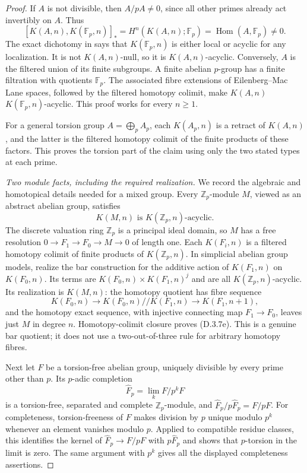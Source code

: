 \begin{proof}
If $A$ is not divisible, then $A/pA\ne0$, since all other primes
already act invertibly on $A$.  Thus
\[
 [K(A,n),K(\mathbb F_p,n)]_*
   =H^n(K(A,n);\mathbb F_p)
   =\operatorname{Hom}(A,\mathbb F_p)\ne0.
\]
The exact dichotomy in
\citet[Lemma~9.13]{EH5Bousfield1997} says that
$K(\mathbb F_p,n)$ is either local or acyclic for any localization.
It is not $K(A,n)$-null, so it is $K(A,n)$-acyclic.  Conversely,
$A$ is the filtered union of its finite subgroups.  A finite abelian
$p$-group has a finite filtration with quotients $\mathbb F_p$.
The associated fibre extensions of Eilenberg--Mac Lane spaces,
followed by the filtered homotopy colimit, make $K(A,n)$
$K(\mathbb F_p,n)$-acyclic.  This proof works for every $n\geq1$.

For a general torsion group $A=\bigoplus_p A_p$, each $K(A_p,n)$
is a retract of $K(A,n)$, and the latter is the filtered homotopy
colimit of the finite products of these factors.  This proves the
torsion part of the claim using only the two stated types at each
prime.

\medskip\noindent
\emph{Two module facts, including the required realization.}
We record the algebraic and homotopical details needed for a mixed
group.  Every $\mathbb Z_p$-module $M$, viewed as an abstract abelian
group, satisfies
\[
              K(M,n)\text{ is }K(\mathbb Z_p,n)\text{-acyclic}.
 \tag{D.3.7e}
\]
The discrete valuation ring $\mathbb Z_p$ is a principal ideal
domain, so $M$ has a free resolution
$0\to F_1\to F_0\to M\to0$ of length one.  Each $K(F_i,n)$ is
a filtered homotopy colimit of finite products of
$K(\mathbb Z_p,n)$.  In simplicial abelian group models, realize the
bar construction for the additive action of $K(F_1,n)$ on
$K(F_0,n)$.  Its terms are
$K(F_0,n)\times K(F_1,n)^j$ and are all
$K(\mathbb Z_p,n)$-acyclic.  Its realization is $K(M,n)$: the
homotopy quotient has fibre sequence
\[
 K(F_0,n)\longrightarrow
 K(F_0,n)\mathbin{\!//\!}K(F_1,n)
                  \longrightarrow K(F_1,n+1),
\]
and the homotopy exact sequence, with injective connecting map
$F_1\to F_0$, leaves just $M$ in degree $n$.  Homotopy-colimit
closure proves (D.3.7e).  This is a genuine bar quotient; it does not
use a two-out-of-three rule for arbitrary homotopy fibres.

Next let $F$ be a torsion-free abelian group, uniquely divisible by
every prime other than $p$.  Its $p$-adic completion
\[
                 \widehat F_p=\lim_k F/p^kF
\]
is a torsion-free, separated and complete $\mathbb Z_p$-module, and
$\widehat F_p/p\widehat F_p=F/pF$.  For completeness, torsion-freeness
of $F$ makes division by $p$ unique modulo $p^k$ whenever an element
vanishes modulo $p$.  Applied to compatible residue classes, this
identifies the kernel of
$\widehat F_p\to F/pF$ with $p\widehat F_p$ and shows that
$p$-torsion in the limit is zero.  The same argument with $p^k$
gives all the displayed completeness assertions.


\end{proof}
